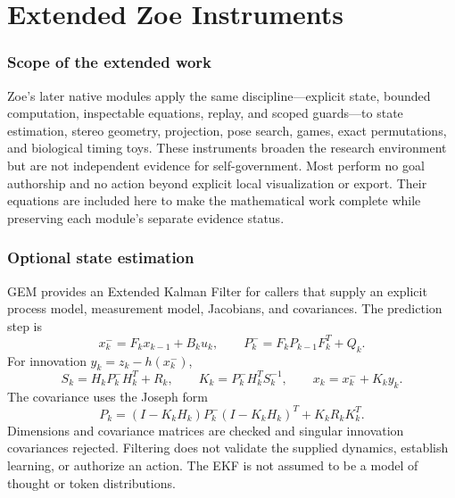 \clearpage
\part{Extended Zoe Instruments}

\section{Scope of the extended work}
Zoe's later native modules apply the same discipline---explicit state, bounded computation, inspectable equations, replay, and scoped guards---to state estimation, stereo geometry, projection, pose search, games, exact permutations, and biological timing toys. These instruments broaden the research environment but are not independent evidence for self-government. Most perform no goal authorship and no action beyond explicit local visualization or export. Their equations are included here to make the mathematical work complete while preserving each module's separate evidence status.

\section{Optional state estimation}
GEM provides an Extended Kalman Filter for callers that supply an explicit process model, measurement model, Jacobians, and covariances. The prediction step is
\begin{equation}
x_k^-=F_kx_{k-1}+B_ku_k,\qquad
P_k^-=F_kP_{k-1}F_k^T+Q_k.
\end{equation}
For innovation $y_k=z_k-h(x_k^-)$,
\begin{equation}
S_k=H_kP_k^-H_k^T+R_k,\qquad
K_k=P_k^-H_k^TS_k^{-1},\qquad
x_k=x_k^-+K_ky_k.
\end{equation}
The covariance uses the Joseph form
\begin{equation}
P_k=(I-K_kH_k)P_k^-(I-K_kH_k)^T+K_kR_kK_k^T.
\end{equation}
Dimensions and covariance matrices are checked and singular innovation covariances rejected. Filtering does not validate the supplied dynamics, establish learning, or authorize an action. The EKF is not assumed to be a model of thought or token distributions.

